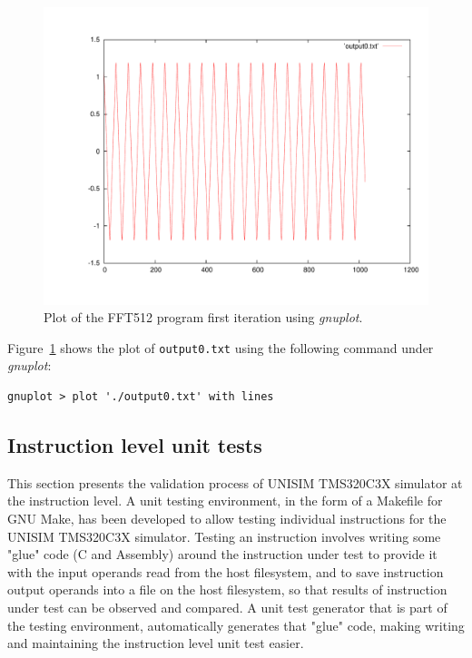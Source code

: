 \begin{figure}[!h]
	\begin{center}
		\includegraphics[width=.8\textwidth]{tms320c3x/fig_fft512_output0.pdf}
		\caption{\label{fig:tms320c3x_manual_fft_output0}Plot of the FFT512 program first iteration using \textit{gnuplot}.}
	\end{center}
\end{figure}

Figure~\ref{fig:tms320c3x_manual_fft_output0} shows the plot of \texttt{output0.txt} using the following command under \textit{gnuplot}:

\begin{verbatim}
gnuplot > plot './output0.txt' with lines
\end{verbatim}

\subsection{Instruction level unit tests}

This section presents the validation process of UNISIM TMS320C3X simulator at the instruction level.
A unit testing environment, in the form of a Makefile for GNU Make, has been developed to allow testing individual instructions for the UNISIM TMS320C3X simulator.
Testing an instruction involves writing some "glue" code (C and Assembly) around the instruction under test to provide it with the input operands read from the host filesystem, and to save instruction output operands into a file on the host filesystem, so that results of instruction under test can be observed and compared.
A unit test generator that is part of the testing environment, automatically generates that "glue" code, making writing and maintaining the instruction level unit test easier.

